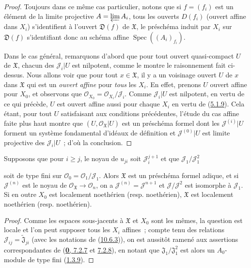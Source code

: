 \begin{proof}
Toujours dans ce même cas particulier, notons que si $f=(f_i)$ est un
élément de la limite projective $A=\varprojlim A_i$, tous les ouverts
$D(f_i)$ (ouvert affine dans $X_i$) s'identifient à l'ouvert
$\mathfrak{D}(f)$ de $\mathfrak{X}$, le préschéma induit par $X_i$ sur
$\mathfrak{D}(f)$ s'identifiant donc au schéma affine
$\operatorname{Spec}((A_i)_{f_i})$.

Dans le cas général, remarquons d'abord que pour tout ouvert quasi-compact
$U$ de $\mathfrak{X}$, chacun des $\mathscr{J}_i|U$ est nilpotent, comme
le montre le raisonnement fait ci-dessus. Nous allons voir que pour tout
$x\in\mathfrak{X}$, il y a un voisinage ouvert $U$ de $x$ dans
$\mathfrak{X}$ qui est un \emph{ouvert affine} pour \emph{tous} les $X_i$. En
effet, prenons $U$ ouvert affine pour $X_0$, et observons que
$\mathscr{O}_{X_0}=\mathscr{O}_{X_i}/\mathscr{J}_i$. Comme
$\mathscr{J}_i|U$ est nilpotent, en vertu de ce qui précède, $U$ est
ouvert affine aussi pour chaque $X_i$ en vertu de
(\hyperref[I.5.1.9-fr]{5.1.9}). Cela étant, pour tout $U$ satisfaisant
aux conditions précédentes, l'étude du cas affine faite plus haut montre
que $(U,\mathscr{O}_{\mathfrak{X}}|U)$ est un préschéma formel dont les
$\mathscr{J}^{(i)}|U$ forment un système fondamental d'idéaux de
définition et $\mathscr{J}^{(0)}|U$ est limite projective des
$\mathscr{J}_i|U$~; d'où la conclusion.
\end{proof}

\begin{corollary}[10.6.4]
\label{I.10.6.4-fr}
Supposons que pour $i\geq j$, le noyau de $u_{ji}$ soit
$\mathscr{J}_i^{j+1}$ et que $\mathscr{J}_1/\mathscr{J}_1^2$


soit de type fini sur
$\mathscr{O}_0=\mathscr{O}_1/\mathscr{J}_1$. Alors $\mathfrak{X}$ est
un préschéma formel adique, et si $\mathscr{J}^{(n)}$ est le noyau de
$\mathscr{O}_{\mathfrak{X}}\to\mathscr{O}_n$, on a
$\mathscr{J}^{(n)}=\mathscr{J}^{n+1}$ et
$\mathscr{J}/\mathscr{J}^2$ est isomorphe à $\mathscr{J}_1$. Si en
outre $X_0$ est localement noethérien \textup{(resp.} noethérien),
$\mathfrak{X}$ est localement noethérien \textup{(resp.} noethérien).
\end{corollary}

\begin{proof}
Comme les espaces sous-jacents à $\mathfrak{X}$ et $X_0$ sont les mêmes,
la question est locale et l'on peut supposer tous les $X_i$ affines~;
compte tenu des relations
$\mathscr{J}_{ij}=\widetilde{\mathfrak{J}}_{ji}$ (avec les notations
de (\hyperref[I.10.6.3-fr]{10.6.3})), on est aussitôt ramené aux
assertions correspondantes de
(\hyperref[0.7.2.7-fr]{\textbf{0}, 7.2.7} et
\hyperref[0.7.2.8-fr]{7.2.8}), en notant que
$\mathfrak{J}_1/\mathfrak{J}_1^2$ est alors un $A_0$-module de type
fini (\hyperref[I.1.3.9-fr]{1.3.9}).
\end{proof}

